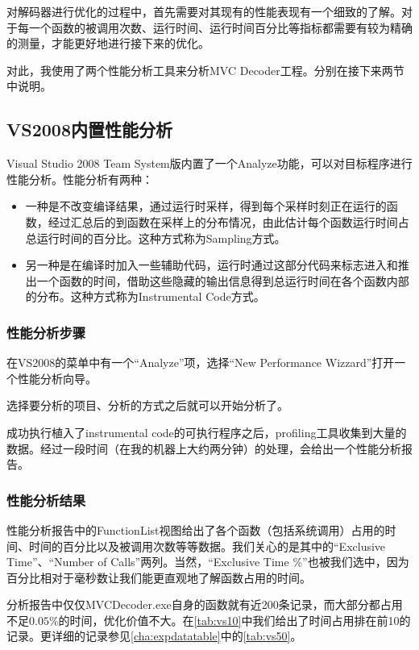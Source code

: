 对解码器进行优化的过程中，首先需要对其现有的性能表现有一个细致的了解。对于每一个函数的被调用次数、运行时间、运行时间百分比等指标都需要有较为精确的测量，才能更好地进行接下来的优化。

对此，我使用了两个性能分析工具来分析MVC Decoder工程。分别在接下来两节中说明。

\subsection{VS2008内置性能分析}
\label{subsec:vsprofiling}
Visual Studio 2008 Team System版内置了一个Analyze功能，可以对目标程序进行性能分析。性能分析有两种：
\begin{itemize}
\item 一种是不改变编译结果，通过运行时采样，得到每个采样时刻正在运行的函数，经过汇总后的到函数在采样上的分布情况，由此估计每个函数运行时间占总运行时间的百分比。这种方式称为Sampling方式。
\item 另一种是在编译时加入一些辅助代码，运行时通过这部分代码来标志进入和推出一个函数的时间，借助这些隐藏的输出信息得到总运行时间在各个函数内部的分布。这种方式称为Instrumental Code方式。
\end{itemize}

\subsubsection{性能分析步骤}
\label{subsubsec:profilingprocess}

在VS2008的菜单中有一个“Analyze”项，选择“New Performance Wizzard”打开一个性能分析向导。

选择要分析的项目、分析的方式之后就可以开始分析了。

成功执行植入了instrumental code的可执行程序之后，profiling工具收集到大量的数据。经过一段时间（在我的机器上大约两分钟）的处理，会给出一个性能分析报告。

\subsubsection{性能分析结果}
\label{subsubsec:reportexerpt}

性能分析报告中的FunctionList视图给出了各个函数（包括系统调用）占用的时间、时间的百分比以及被调用次数等等数据。我们关心的是其中的“Exclusive Time”、“Number of Calls”两列。当然，“Exclusive Time \%”也被我们选中，因为百分比相对于毫秒数让我们能更直观地了解函数占用的时间。



分析报告中仅仅MVCDecoder.exe自身的函数就有近200条记录，而大部分都占用不足$0.05\%$的时间，优化价值不大。在\autoref{tab:vs10}中我们给出了时间占用排在前10的记录。更详细的记录参见\autoref{cha:expdatatable}中的\autoref{tab:vs50}。

